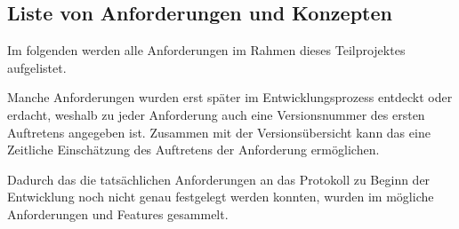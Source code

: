 \subsection{Liste von Anforderungen und Konzepten}

Im folgenden werden alle Anforderungen im Rahmen dieses Teilprojektes aufgelistet.\par
Manche Anforderungen wurden erst später im Entwicklungsprozess entdeckt oder erdacht, weshalb zu jeder Anforderung auch eine Versionsnummer des ersten Auftretens angegeben ist. Zusammen mit der Versionsübersicht kann das eine Zeitliche Einschätzung des Auftretens der Anforderung ermöglichen.

Dadurch das die tatsächlichen Anforderungen an das Protokoll zu Beginn der Entwicklung noch nicht genau festgelegt werden konnten, wurden im mögliche Anforderungen und Features gesammelt.

